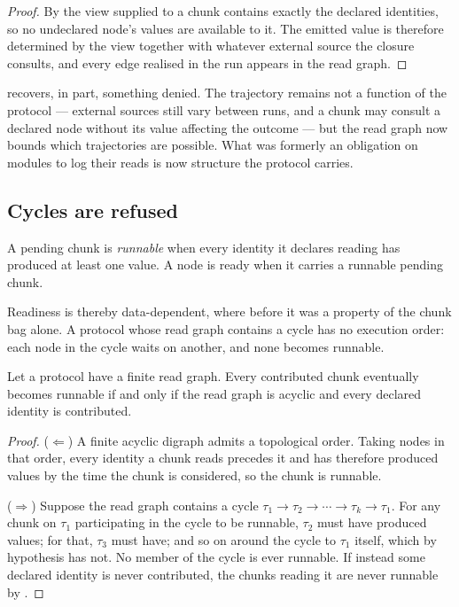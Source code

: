 \begin{proof}
By  the view supplied to a chunk contains exactly the declared
identities, so no undeclared node's values are available to it. The emitted
value is therefore determined by the view together with whatever external
source the closure consults, and every edge realised in the run appears in the
read graph.
\end{proof}

 recovers, in part, something 
denied. The trajectory remains not a function of the protocol --- external
sources still vary between runs, and a chunk may consult a declared node
without its value affecting the outcome --- but the read graph now bounds
which trajectories are possible. What was formerly an obligation on modules to
log their reads is now structure the protocol carries.

\subsection{Cycles are refused}

\begin{definition}[Runnable]
\label{def:runnable}
A pending chunk is \emph{runnable} when every identity it declares reading has
produced at least one value. A node is ready when it carries a runnable
pending chunk.
\end{definition}

Readiness is thereby data-dependent, where before it was a property of the
chunk bag alone. A protocol whose read graph contains a cycle has no
execution order: each node in the cycle waits on another, and none becomes
runnable.

\begin{theorem}
\label{thm:acyclic}
Let a protocol have a finite read graph. Every contributed chunk eventually
becomes runnable if and only if the read graph is acyclic and every declared
identity is contributed.
\end{theorem}

\begin{proof}
($\Leftarrow$) A finite acyclic digraph admits a topological order. Taking
nodes in that order, every identity a chunk reads precedes it and has
therefore produced values by the time the chunk is considered, so the chunk is
runnable.

($\Rightarrow$) Suppose the read graph contains a cycle
$\tau_1\to\tau_2\to\cdots\to\tau_k\to\tau_1$. For any chunk on $\tau_1$
participating in the cycle to be runnable, $\tau_2$ must have produced values;
for that, $\tau_3$ must have; and so on around the cycle to $\tau_1$ itself,
which by hypothesis has not. No member of the cycle is ever runnable. If
instead some declared identity is never contributed, the chunks reading it are
never runnable by .
\end{proof}

